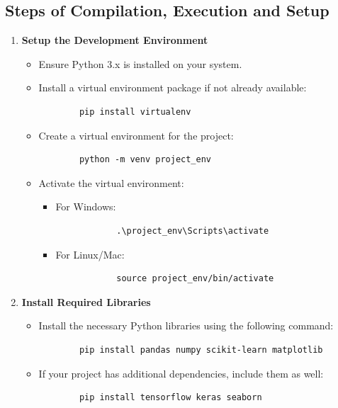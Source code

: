 \subsection{Steps of Compilation, Execution and Setup}
\begin{enumerate}
    \item \textbf{Setup the Development Environment}
    \begin{itemize}
        \item Ensure Python 3.x is installed on your system.
        \item Install a virtual environment package if not already available:
        \begin{verbatim}
        pip install virtualenv
        \end{verbatim}
        \item Create a virtual environment for the project:
        \begin{verbatim}
        python -m venv project_env
        \end{verbatim}
        \item Activate the virtual environment:
        \begin{itemize}
            \item For Windows:
            \begin{verbatim}
            .\project_env\Scripts\activate
            \end{verbatim}
            \item For Linux/Mac:
            \begin{verbatim}
            source project_env/bin/activate
            \end{verbatim}
        \end{itemize}
    \end{itemize}

    \item \textbf{Install Required Libraries}
    \begin{itemize}
        \item Install the necessary Python libraries using the following command:
        \begin{verbatim}
        pip install pandas numpy scikit-learn matplotlib
        \end{verbatim}
        \item If your project has additional dependencies, include them as well:
        \begin{verbatim}
        pip install tensorflow keras seaborn
        \end{verbatim}
    \end{itemize}


\end{enumerate}
